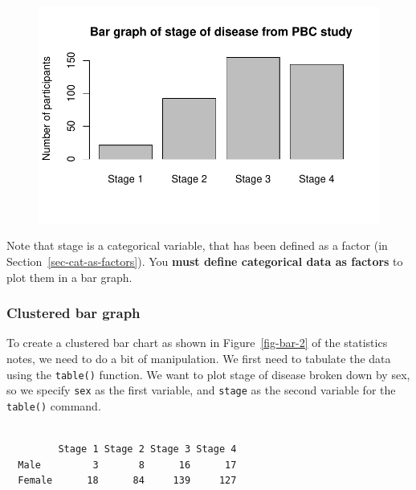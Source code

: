 \documentclass[
  a4paper,
]{memoir}
\newenvironment{Shaded}{\begin{snugshade}}{\end{snugshade}}
\newcommand{\FunctionTok}[1]{\textcolor[rgb]{0.00,0.00,0.00}{#1}}
\newcommand{\NormalTok}[1]{\textcolor[rgb]{0.00,0.00,0.00}{#1}}
\newcommand{\OtherTok}[1]{\textcolor[rgb]{0.00,0.00,0.00}{#1}}
\newcommand{\SpecialCharTok}[1]{\textcolor[rgb]{0.00,0.00,0.00}{#1}}
\begin{document}
\begin{figure}[H]

{\centering \includegraphics{01-intro_files/figure-pdf/unnamed-chunk-101-1.pdf}

}

\end{figure}

Note that stage is a categorical variable, that has been defined as a
factor (in Section~\ref{sec-cat-as-factors}). You \textbf{must define
categorical data as factors} to plot them in a bar graph.

\hypertarget{clustered-bar-graph-1}{%
\subsubsection{Clustered bar graph}\label{clustered-bar-graph-1}}

To create a clustered bar chart as shown in Figure~\ref{fig-bar-2} of
the statistics notes, we need to do a bit of manipulation. We first need
to tabulate the data using the \texttt{table()} function. We want to
plot stage of disease broken down by sex, so we specify \texttt{sex} as
the first variable, and \texttt{stage} as the second variable for the
\texttt{table()} command.

\begin{Shaded}
\end{Shaded}

\begin{verbatim}
        
         Stage 1 Stage 2 Stage 3 Stage 4
  Male         3       8      16      17
  Female      18      84     139     127
\end{verbatim}
\end{document}
